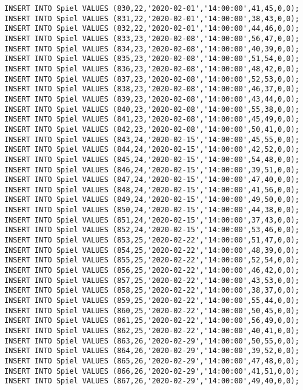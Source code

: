 \documentclass{bschlangaul-aufgabe}
\begin{document}
\begin{verbatim}
INSERT INTO Spiel VALUES (830,22,'2020-02-01','14:00:00',41,45,0,0);
INSERT INTO Spiel VALUES (831,22,'2020-02-01','14:00:00',38,43,0,0);
INSERT INTO Spiel VALUES (832,22,'2020-02-01','14:00:00',44,46,0,0);
INSERT INTO Spiel VALUES (833,23,'2020-02-08','14:00:00',56,47,0,0);
INSERT INTO Spiel VALUES (834,23,'2020-02-08','14:00:00',40,39,0,0);
INSERT INTO Spiel VALUES (835,23,'2020-02-08','14:00:00',51,54,0,0);
INSERT INTO Spiel VALUES (836,23,'2020-02-08','14:00:00',48,42,0,0);
INSERT INTO Spiel VALUES (837,23,'2020-02-08','14:00:00',52,53,0,0);
INSERT INTO Spiel VALUES (838,23,'2020-02-08','14:00:00',46,37,0,0);
INSERT INTO Spiel VALUES (839,23,'2020-02-08','14:00:00',43,44,0,0);
INSERT INTO Spiel VALUES (840,23,'2020-02-08','14:00:00',55,38,0,0);
INSERT INTO Spiel VALUES (841,23,'2020-02-08','14:00:00',45,49,0,0);
INSERT INTO Spiel VALUES (842,23,'2020-02-08','14:00:00',50,41,0,0);
INSERT INTO Spiel VALUES (843,24,'2020-02-15','14:00:00',45,55,0,0);
INSERT INTO Spiel VALUES (844,24,'2020-02-15','14:00:00',42,52,0,0);
INSERT INTO Spiel VALUES (845,24,'2020-02-15','14:00:00',54,48,0,0);
INSERT INTO Spiel VALUES (846,24,'2020-02-15','14:00:00',39,51,0,0);
INSERT INTO Spiel VALUES (847,24,'2020-02-15','14:00:00',47,40,0,0);
INSERT INTO Spiel VALUES (848,24,'2020-02-15','14:00:00',41,56,0,0);
INSERT INTO Spiel VALUES (849,24,'2020-02-15','14:00:00',49,50,0,0);
INSERT INTO Spiel VALUES (850,24,'2020-02-15','14:00:00',44,38,0,0);
INSERT INTO Spiel VALUES (851,24,'2020-02-15','14:00:00',37,43,0,0);
INSERT INTO Spiel VALUES (852,24,'2020-02-15','14:00:00',53,46,0,0);
INSERT INTO Spiel VALUES (853,25,'2020-02-22','14:00:00',51,47,0,0);
INSERT INTO Spiel VALUES (854,25,'2020-02-22','14:00:00',48,39,0,0);
INSERT INTO Spiel VALUES (855,25,'2020-02-22','14:00:00',52,54,0,0);
INSERT INTO Spiel VALUES (856,25,'2020-02-22','14:00:00',46,42,0,0);
INSERT INTO Spiel VALUES (857,25,'2020-02-22','14:00:00',43,53,0,0);
INSERT INTO Spiel VALUES (858,25,'2020-02-22','14:00:00',38,37,0,0);
INSERT INTO Spiel VALUES (859,25,'2020-02-22','14:00:00',55,44,0,0);
INSERT INTO Spiel VALUES (860,25,'2020-02-22','14:00:00',50,45,0,0);
INSERT INTO Spiel VALUES (861,25,'2020-02-22','14:00:00',56,49,0,0);
INSERT INTO Spiel VALUES (862,25,'2020-02-22','14:00:00',40,41,0,0);
INSERT INTO Spiel VALUES (863,26,'2020-02-29','14:00:00',50,55,0,0);
INSERT INTO Spiel VALUES (864,26,'2020-02-29','14:00:00',39,52,0,0);
INSERT INTO Spiel VALUES (865,26,'2020-02-29','14:00:00',47,48,0,0);
INSERT INTO Spiel VALUES (866,26,'2020-02-29','14:00:00',41,51,0,0);
INSERT INTO Spiel VALUES (867,26,'2020-02-29','14:00:00',49,40,0,0);

\end{verbatim}
\end{document}

